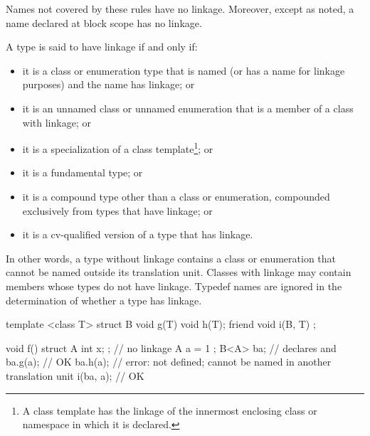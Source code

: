 \pnum
{}%
Names not covered by these rules have no linkage. Moreover, except as
noted, a name declared at block scope has no
linkage.

\pnum
A type is said to have linkage if and only if:
\begin{itemize}
\item it is a class or enumeration type that is named (or has a name for
linkage purposes) and the name has linkage; or

\item it is an unnamed class or unnamed enumeration that is a member of a class
with linkage; or

\item it is a specialization of a class template\footnote{A class
template has the linkage of the innermost enclosing class or namespace in which
it is declared.};
or

\item it is a fundamental type; or

\item it is a compound type other than a class or
enumeration, compounded exclusively from types that have linkage; or

\item it is a cv-qualified version of a
type that has linkage.
\end{itemize}
\begin{note}
In other words, a type without linkage contains a class or enumeration that
cannot be named outside its translation unit.
Classes with linkage may contain members
whose types do not have linkage.
Typedef names are ignored in the determination
of whether a type has linkage.
\end{note}

\begin{example}
\begin{codeblock}
template <class T> struct B {
  void g(T) { }
  void h(T);
  friend void i(B, T) { }
};

void f() {
  struct A { int x; };  // no linkage
  A a = { 1 };
  B<A> ba;              // declares  and 
  ba.g(a);              // OK
  ba.h(a);              // error:  not defined;  cannot be named in another translation unit
  i(ba, a);             // OK
}
\end{codeblock}
\end{example}

